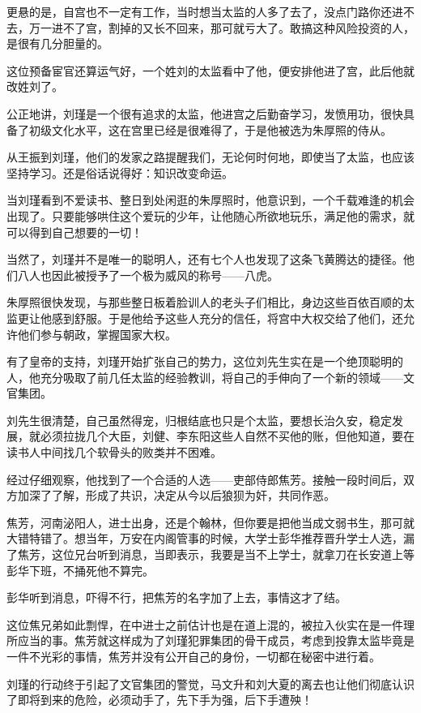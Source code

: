 \begin{multicols}{\theparacolNo}
		更悬的是，自宫也不一定有工作，当时想当太监的人多了去了，没点门路你还进不去，万一进不了宫，割掉的又长不回来，那可就亏大了。敢搞这种风险投资的人，是很有几分胆量的。

		这位预备宦官还算运气好，一个姓刘的太监看中了他，便安排他进了宫，此后他就改姓刘了。

		公正地讲，刘瑾是一个很有追求的太监，他进宫之后勤奋学习，发愤用功，很快具备了初级文化水平，这在宫里已经是很难得了，于是他被选为朱厚照的侍从。

		从王振到刘瑾，他们的发家之路提醒我们，无论何时何地，即使当了太监，也应该坚持学习。还是俗话说得好：知识改变命运。

		当刘瑾看到不爱读书、整日到处闲逛的朱厚照时，他意识到，一个千载难逢的机会出现了。只要能够哄住这个爱玩的少年，让他随心所欲地玩乐，满足他的需求，就可以得到自己想要的一切！

		当然了，刘瑾并不是唯一的聪明人，还有七个人也发现了这条飞黄腾达的捷径。他们八人也因此被授予了一个极为威风的称号——八虎。

		朱厚照很快发现，与那些整日板着脸训人的老头子们相比，身边这些百依百顺的太监更让他感到舒服。于是他给予这些人充分的信任，将宫中大权交给了他们，还允许他们参与朝政，掌握国家大权。

		有了皇帝的支持，刘瑾开始扩张自己的势力，这位刘先生实在是一个绝顶聪明的人，他充分吸取了前几任太监的经验教训，将自己的手伸向了一个新的领域——文官集团。

		刘先生很清楚，自己虽然得宠，归根结底也只是个太监，要想长治久安，稳定发展，就必须拉拢几个大臣，刘健、李东阳这些人自然不买他的账，但他知道，要在读书人中间找几个软骨头的败类并不困难。

		经过仔细观察，他找到了一个合适的人选——吏部侍郎焦芳。接触一段时间后，双方加深了了解，形成了共识，决定从今以后狼狈为奸，共同作恶。

		焦芳，河南泌阳人，进士出身，还是个翰林，但你要是把他当成文弱书生，那可就大错特错了。想当年，万安在内阁管事的时候，大学士彭华推荐晋升学士人选，漏了焦芳，这位兄台听到消息，当即表示，我要是当不上学士，就拿刀在长安道上等彭华下班，不捅死他不算完。

		彭华听到消息，吓得不行，把焦芳的名字加了上去，事情这才了结。

		这位焦兄弟如此剽悍，在中进士之前估计也是在道上混的，被拉入伙实在是一件理所应当的事。焦芳就这样成为了刘瑾犯罪集团的骨干成员，考虑到投靠太监毕竟是一件不光彩的事情，焦芳并没有公开自己的身份，一切都在秘密中进行着。

		刘瑾的行动终于引起了文官集团的警觉，马文升和刘大夏的离去也让他们彻底认识了即将到来的危险，必须动手了，先下手为强，后下手遭殃！


\end{multicols}
